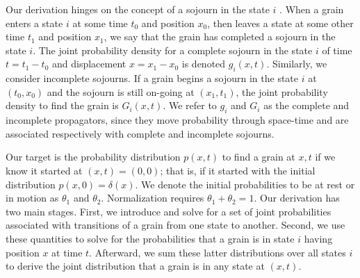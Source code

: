 \documentclass[draft,grl]{agujournal2018}
\begin{document}
Our derivation hinges on the concept of a sojourn in the state $i$ \citep{Weiss1994}.
When a grain enters a state $i$ at some time $t_0$ and position $x_0$, then leaves a state at some other time $t_1$ and position $x_1$, we say that the grain has completed a sojourn in the state $i$. The joint probability density for a complete sojourn in the state $i$ of time $t = t_1-t_0$ and displacement $x = x_1-x_0$ is denoted $g_i(x,t).$ 
Similarly, we consider incomplete sojourns. If a grain begins a sojourn in the state $i$ at $(t_0,x_0)$ and the sojourn is still on-going at $(x_1,t_1)$, the joint probability density to find the grain is $G_i(x,t)$.
We refer to $g_i$ and $G_i$ as the complete and incomplete propagators, since they move probability through space-time and are associated respectively with complete and incomplete sojourns.

Our target is the probability distribution $p(x,t)$ to find a grain at $x,t$ if we know it started at $(x,t)=(0,0)$; that is, if it started with the initial distribution $p(x,0)=\delta(x)$.
We denote the initial probabilities to be at rest or in motion as $\theta_1$ and $\theta_2$. Normalization requires $\theta_1+\theta_2=1$.
Our derivation has two main stages.
First, we introduce and solve for a set of joint probabilities associated with transitions of a grain from one state to another.
Second, we use these quantities to solve for the probabilities that a grain is in state $i$ having position $x$ at time $t$.
Afterward, we sum these latter distributions over all states $i$ to derive the joint distribution that a grain is in any state at $(x,t)$.
\end{document}
